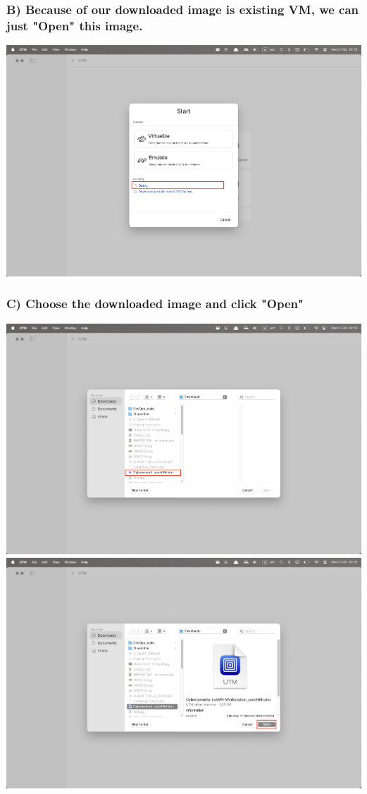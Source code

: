 \documentclass{article}
\begin{document}
\subsubsection*{B) Because of our downloaded image is existing VM, we can just "Open" this image. }
\includegraphics[width=1\textwidth]{Part2/Step1/2.png}

\subsubsection*{C) Choose the downloaded image and click "Open" }
\includegraphics[width=1\textwidth]{Part2/Step1/3.png}
\includegraphics[width=1\textwidth]{Part2/Step1/4.png}
\end{document}
